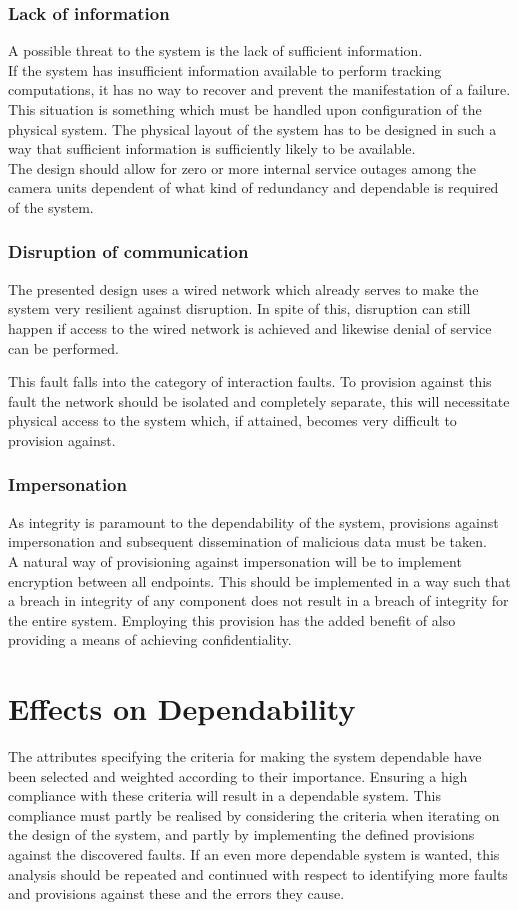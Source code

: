 \subsubsection{Lack of information}
A possible threat to the system is the lack of sufficient information.\\
If the system has insufficient information available to perform tracking computations, it has no way to recover and prevent the manifestation of a failure.
This situation is something which must be handled upon configuration of the physical system.
The physical layout of the system has to be designed in such a way that sufficient information is sufficiently likely to be available.\\
The design should allow for zero or more internal service outages among the camera units dependent of what kind of redundancy and dependable is required of the system.

\subsubsection{Disruption of communication}
The presented design uses a wired network which already serves to make the system very resilient against disruption.
In spite of this, disruption can still happen if access to the wired network is achieved and likewise denial of service can be performed.

This fault falls into the category of interaction faults.\autocite{rts_depend}
To provision against this fault the network should be isolated and completely separate,
this will necessitate physical access to the system which, if attained, becomes very difficult to provision against.

\subsubsection{Impersonation}
As integrity is paramount to the dependability of the system, provisions against impersonation and subsequent dissemination of malicious data must be taken.\\
A natural way of provisioning against impersonation will be to implement encryption between all endpoints.
This should be implemented in a way such that a breach in integrity of any component does not result in a breach of integrity for the entire system.
Employing this provision has the added benefit of also providing a means of achieving confidentiality.

\section{Effects on Dependability}
The attributes specifying the criteria for making the system dependable have been selected and weighted according to their importance.
Ensuring a high compliance with these criteria will result in a dependable system.
This compliance must partly be realised by considering the criteria when iterating on the design of the system,
and partly by implementing the defined provisions against the discovered faults.
If an even more dependable system is wanted, this analysis should be repeated and continued with respect to identifying more faults
and provisions against these and the errors they cause.